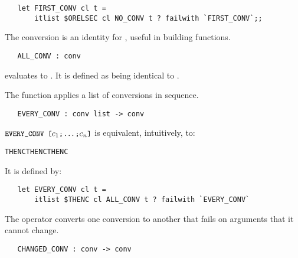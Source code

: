 \begin{hol}\begin{verbatim}
   let FIRST_CONV cl t =
       itlist $ORELSEC cl NO_CONV t ? failwith `FIRST_CONV`;;
\end{verbatim}\end{hol}

The conversion  is an identity for , useful
in building functions.

\begin{boxed}
\begin{verbatim}
   ALL_CONV : conv
\end{verbatim}\end{boxed}

\noindent {} evaluates to . It is
defined as being identical to .

The function  applies a list of conversions in sequence.

\begin{boxed}
\begin{verbatim}
   EVERY_CONV : conv list -> conv
\end{verbatim}\end{boxed}

\noindent $\ml{EVERY\_CONV [}c_1\ml{;}\ldots\ml{;}c_n\ml{]}$ is equivalent,
intuitively, to:

\begin{hol}
\begin{alltt}
    THENC  THENC \m{\ldots} THENC 
\end{alltt}\end{hol}

\noindent It is defined by:

\begin{hol}\begin{verbatim}
   let EVERY_CONV cl t =
       itlist $THENC cl ALL_CONV t ? failwith `EVERY_CONV`
\end{verbatim}\end{hol}

The operator  converts one conversion to another that
fails on arguments that it cannot change.

\begin{boxed}
\begin{verbatim}
   CHANGED_CONV : conv -> conv
\end{verbatim}\end{boxed}

